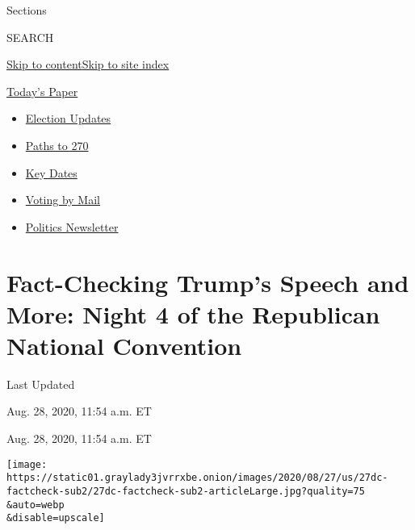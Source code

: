 Sections

SEARCH

\protect\hyperlink{site-content}{Skip to
content}\protect\hyperlink{site-index}{Skip to site index}

\href{https://myaccount.nytimes3xbfgragh.onion/auth/login?response_type=cookie\&client_id=vi}{}

\href{https://www.nytimes3xbfgragh.onion/section/todayspaper}{Today's
Paper}

\begin{itemize}
\item
  \href{https://www.nytimes3xbfgragh.onion/live/2020/09/11/us/trump-vs-biden?action=click\&pgtype=Article\&state=default\&region=TOP_BANNER\&context=storylines_menu}{Election
  Updates}
\item
  \href{https://www.nytimes3xbfgragh.onion/interactive/2020/us/elections/election-states-biden-trump.html?action=click\&pgtype=Article\&state=default\&region=TOP_BANNER\&context=storylines_menu}{Paths
  to 270}
\item
  \href{https://www.nytimes3xbfgragh.onion/interactive/2019/us/elections/2020-presidential-election-calendar.html?action=click\&pgtype=Article\&state=default\&region=TOP_BANNER\&context=storylines_menu}{Key
  Dates}
\item
  \href{https://www.nytimes3xbfgragh.onion/interactive/2020/08/31/us/politics/vote-by-mail-deadlines.html?action=click\&pgtype=Article\&state=default\&region=TOP_BANNER\&context=storylines_menu}{Voting
  by Mail}
\item
  \href{https://www.nytimes3xbfgragh.onion/newsletters/politics?action=click\&pgtype=Article\&state=default\&region=TOP_BANNER\&context=storylines_menu}{Politics
  Newsletter}
\end{itemize}

\hypertarget{fact-checking-trumps-speech-and-more-night-4-of-the-republican-national-convention}{%
\section{Fact-Checking Trump's Speech and More: Night 4 of the
Republican National
Convention}\label{fact-checking-trumps-speech-and-more-night-4-of-the-republican-national-convention}}

Last Updated

Aug. 28, 2020, 11:54 a.m. ET

Aug. 28, 2020, 11:54 a.m. ET

\texttt{[image: https://static01.graylady3jvrrxbe.onion/images/2020/08/27/us/27dc-factcheck-sub2/27dc-factcheck-sub2-articleLarge.jpg?quality=75\\\&auto=webp\\\&disable=upscale]}

